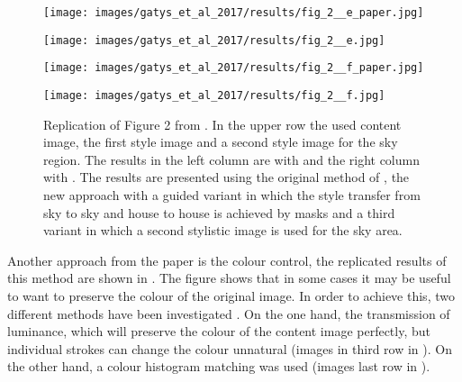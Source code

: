 \begin{figure}[H]
\begin{minipage}[t]{0.45\textwidth}
\end{minipage}
\hfill%
\begin{minipage}[t]{0.45\textwidth}
	\centering
	\texttt{[image: images/gatys\_et\_al\_2017/results/fig\_2\_\_e\_paper.jpg]} 
\end{minipage}
\hfill%
\begin{minipage}[t]{0.45\textwidth}
	\centering
	\texttt{[image: images/gatys\_et\_al\_2017/results/fig\_2\_\_e.jpg]}
\end{minipage}
\hfill%
\begin{minipage}[t]{0.45\textwidth}
	\centering
	\texttt{[image: images/gatys\_et\_al\_2017/results/fig\_2\_\_f\_paper.jpg]}
\end{minipage}
\hfill%
\begin{minipage}[t]{0.45\textwidth}
	\centering
	\texttt{[image: images/gatys\_et\_al\_2017/results/fig\_2\_\_f.jpg]}
\end{minipage}
	\hfill%
\begin{minipage}[t]{0.45\textwidth}
	\centering
	\paper{}
\end{minipage}
\hfill%
\begin{minipage}[t]{0.45\textwidth}
	\centering
	\implementation{}
\end{minipage}
\caption{Replication of Figure 2 from \cite{GEB+2017}. In the upper row the used content image, the first style image and a second style image for the sky region. The results in the left column are with  \paper{} and the right column with \implementation{}.  The results are presented using the original method of \cite{GEB2016}, the new approach with a guided variant in which the style transfer from sky to sky and house to house is achieved by masks and a third variant in which a second stylistic image is used for the sky area.}
\label{fig:GEB+2017_fig2}
\end{figure}

Another approach from the paper is the colour control, the replicated results of this method are shown in . The figure shows that in some cases it may be useful to want to preserve the colour of the original image. In order to achieve this, two different methods have been investigated \cite{GEB+2017}. On the one hand, the transmission of luminance, which will preserve the colour of the content image perfectly, but individual strokes can change the colour unnatural \cite{GEB+2017} (images in third row in ). On the other hand, a colour histogram matching was used \cite{GEB+2017}(images last row in ).

